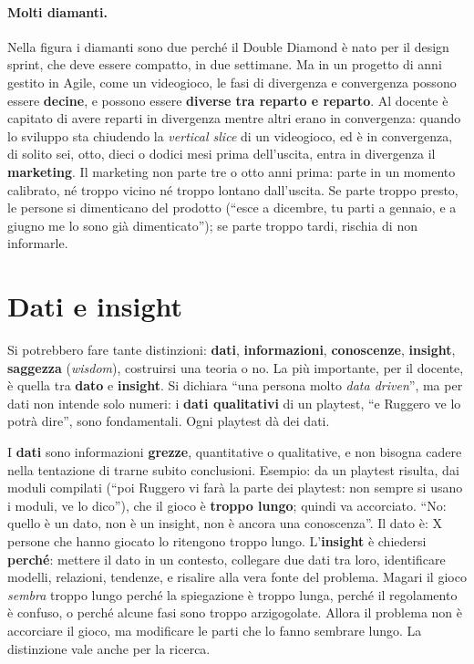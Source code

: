 \paragraph{Molti diamanti.} Nella figura i diamanti sono due perché il Double Diamond è
nato per il design sprint, che deve essere compatto, in due settimane. Ma in un progetto
di anni gestito in Agile, come un videogioco, le fasi di divergenza e convergenza possono
essere \textbf{decine}, e possono essere \textbf{diverse tra reparto e reparto}.
Al docente è capitato di avere reparti in divergenza mentre altri erano in convergenza:
quando lo sviluppo sta chiudendo la \emph{vertical slice} di un videogioco, ed è in
convergenza, di solito sei, otto, dieci o dodici mesi prima dell'uscita, entra in
divergenza il \textbf{marketing}. Il marketing non parte tre o otto anni prima: parte in
un momento calibrato, né troppo vicino né troppo lontano dall'uscita. Se parte troppo
presto, le persone si dimenticano del prodotto (``esce a dicembre, tu parti a gennaio, e
a giugno me lo sono già dimenticato''); se parte troppo tardi, rischia di non informarle.

\section{Dati e insight}
\label{a5:sec:insight}



Si potrebbero fare tante distinzioni: \textbf{dati}, \textbf{informazioni},
\textbf{conoscenze}, \textbf{insight}, \textbf{saggezza} (\emph{wisdom}), costruirsi una
teoria o no. La più importante, per il docente, è quella tra \textbf{dato} e
\textbf{insight}. Si dichiara ``una persona molto \emph{data driven}'', ma per dati non
intende solo numeri: i \textbf{dati qualitativi} di un playtest, ``e Ruggero ve lo potrà
dire'', sono fondamentali. Ogni playtest dà dei dati.

I \textbf{dati} sono informazioni \textbf{grezze}, quantitative o qualitative, e non
bisogna cadere nella tentazione di trarne subito conclusioni. Esempio: da un playtest
risulta, dai moduli compilati (``poi Ruggero vi farà la parte dei playtest: non sempre si
usano i moduli, ve lo dico''), che il gioco è \textbf{troppo lungo}; quindi va accorciato.
``No: quello è un dato, non è un insight, non è ancora una conoscenza''. Il dato è: X
persone che hanno giocato lo ritengono troppo lungo. L'\textbf{insight} è chiedersi
\textbf{perché}: mettere il dato in un contesto, collegare due dati tra loro,
identificare modelli, relazioni, tendenze, e risalire alla vera fonte del problema.
Magari il gioco \emph{sembra} troppo lungo perché la spiegazione è troppo lunga, perché il
regolamento è confuso, o perché alcune fasi sono troppo arzigogolate. Allora il problema
non è accorciare il gioco, ma modificare le parti che lo fanno sembrare lungo. La
distinzione vale anche per la ricerca.

